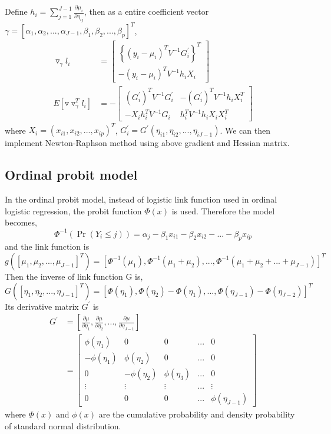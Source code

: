 Define $h_i = \sum_{j=1}^{J-1} \frac{\partial \mu_i}{\partial \eta_{ij}}$, then as a entire coefficient vector $\gamma = [\alpha_1, \alpha_2, ..., \alpha_{J-1}, \beta_1, \beta_2, ..., \beta_p]^T$,
\begin{align*}
\triangledown_\gamma l_i &= \left[ \begin{array}{c}
					\left\{(y_i - \mu_i)^T V^{-1} G_i^{\prime} \right\}^T \\
					-(y_i - \mu_i)^T V^{-1} h_i X_i
				   \end{array} \right] \\
E\left[\triangledown \triangledown^T_\gamma l_i\right] & = - \left[ \begin{array}{cc}
							(G_i^\prime)^T V^{-1} G_i^\prime & -(G_i^\prime)^T V^{-1} h_i X_i^T \\
							-X_i h_i^T V^{-1} G_i & h_i^T V^{-1} h_i X_iX_i^T
						      \end{array} 
						\right]
\end{align*}
where $X_i = (x_{i1}, x_{i2}, ... , x_{ip})^T$, $G_i^\prime = G^\prime(\eta_{i1},\eta_{i2},...,\eta_{iJ-1})$. We can then implement Newton-Raphson method using above gradient and Hessian matrix.

\subsection{Ordinal probit model}
In the ordinal probit model, instead of logistic link function used in ordinal logistic regression, the probit function $\Phi(x)$ is used. Therefore the model becomes,
\[
\Phi^{-1}\left( \Pr(Y_i \le j) \right) = \alpha_j - \beta_1 x_{i1} - \beta_2 x_{i2} - ... - \beta_p x_{ip}
\]
and the link function is 
\[
g\left([\mu_1, \mu_2, ..., \mu_{J-1}]^T\right) = \left[\Phi^{-1}(\mu_1), \Phi^{-1}(\mu_1+\mu_2), ..., \Phi^{-1}(\mu_1+\mu_2+...+\mu_{J-1})\right]^T
\] 
Then the inverse of link function G is,
\[
G\left([\eta_1, \eta_2, ..., \eta_{J-1}]^T\right)  = \left[\Phi(\eta_1), \Phi(\eta_2) - \Phi(\eta_1), ..., \Phi(\eta_{J-1}) - \Phi(\eta_{J-2})\right]^T
\]
Its derivative matrix $G^\prime$ is
\begin{align*}
G^\prime & = \left[\frac{\partial \mu}{\partial \eta_1}, \frac{\partial \mu}{\partial \eta_2}, ..., \frac{\partial \mu}{\partial \eta_{J-1}}\right] \\
& = \left[ \begin{array}{ccccc}
	      \phi(\eta_1) & 0 & 0 & ... & 0 \\
	     -\phi(\eta_1) & \phi(\eta_2) & 0 & ... & 0 \\
	     0 & -\phi(\eta_2) & \phi(\eta_3) & ... & 0 \\
	     \vdots & \vdots & \vdots & ... & \vdots \\
	     0 & 0 & 0 & ... & \phi(\eta_{J-1})
	   \end{array} \right]
\end{align*}
where $\Phi(x)$ and $\phi(x)$ are the cumulative probability and density probability of standard normal distribution.
